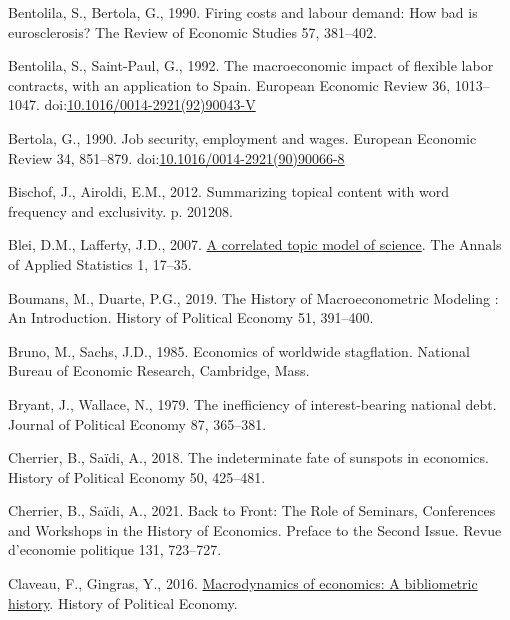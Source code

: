 \documentclass[
  12pt,
  onecolumn]{article}
\newlength{\cslhangindent}
\newlength{\cslentryspacingunit} %
\newenvironment{CSLReferences}[2] %
 {%
  \setlength{\parindent}{0pt}
  \ifodd #1
  \let\oldpar\par
  \def\par{\hangindent=\cslhangindent\oldpar}
  \fi
  \setlength{\parskip}{#2\cslentryspacingunit}
 }%
 {}
\begin{document}
\begin{CSLReferences}{1}{0}
\leavevmode{}%
Bentolila, S., Bertola, G., 1990. Firing costs and labour demand: How
bad is eurosclerosis? The Review of Economic Studies 57, 381--402.

\leavevmode{}%
Bentolila, S., Saint-Paul, G., 1992. The macroeconomic impact of
flexible labor contracts, with an application to {Spain}. European
Economic Review 36, 1013--1047.
doi:\href{https://doi.org/10.1016/0014-2921(92)90043-V}{10.1016/0014-2921(92)90043-V}

\leavevmode{}%
Bertola, G., 1990. Job security, employment and wages. European Economic
Review 34, 851--879.
doi:\href{https://doi.org/10.1016/0014-2921(90)90066-8}{10.1016/0014-2921(90)90066-8}

\leavevmode{}%
Bischof, J., Airoldi, E.M., 2012. Summarizing topical content with word
frequency and exclusivity. p. 201208.

\leavevmode{}%
Blei, D.M., Lafferty, J.D., 2007.
\href{https://www.jstor.org/stable/4537420}{A correlated topic model of
science}. The Annals of Applied Statistics 1, 17--35.

\leavevmode{}%
Boumans, M., Duarte, P.G., 2019. The {History} of {Macroeconometric
Modeling} : {An Introduction}. History of Political Economy 51,
391--400.

\leavevmode{}%
Bruno, M., Sachs, J.D., 1985. Economics of worldwide stagflation.
{National Bureau of Economic Research}, {Cambridge, Mass.}

\leavevmode{}%
Bryant, J., Wallace, N., 1979. The inefficiency of interest-bearing
national debt. Journal of Political Economy 87, 365--381.

\leavevmode{}%
Cherrier, B., Saïdi, A., 2018. The indeterminate fate of sunspots in
economics. History of Political Economy 50, 425--481.

\leavevmode{}%
Cherrier, B., Saïdi, A., 2021. Back to {Front}: {The Role} of
{Seminars}, {Conferences} and {Workshops} in the {History} of
{Economics}. {Preface} to the {Second Issue}. Revue d'economie politique
131, 723--727.

\leavevmode{}%
Claveau, F., Gingras, Y., 2016.
\href{http://hope.dukejournals.org/cgi/content/short/48/4/551?rss=1}{Macrodynamics
of economics: A bibliometric history}. History of Political Economy.


\end{CSLReferences}
\end{document}
